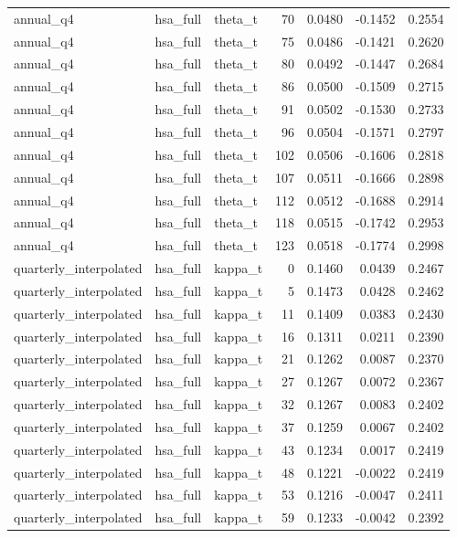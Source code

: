 \begin{tabular}{lllrrrr}
annual\_q4 & hsa\_full & theta\_t & 70 & 0.0480 & -0.1452 & 0.2554 \\
annual\_q4 & hsa\_full & theta\_t & 75 & 0.0486 & -0.1421 & 0.2620 \\
annual\_q4 & hsa\_full & theta\_t & 80 & 0.0492 & -0.1447 & 0.2684 \\
annual\_q4 & hsa\_full & theta\_t & 86 & 0.0500 & -0.1509 & 0.2715 \\
annual\_q4 & hsa\_full & theta\_t & 91 & 0.0502 & -0.1530 & 0.2733 \\
annual\_q4 & hsa\_full & theta\_t & 96 & 0.0504 & -0.1571 & 0.2797 \\
annual\_q4 & hsa\_full & theta\_t & 102 & 0.0506 & -0.1606 & 0.2818 \\
annual\_q4 & hsa\_full & theta\_t & 107 & 0.0511 & -0.1666 & 0.2898 \\
annual\_q4 & hsa\_full & theta\_t & 112 & 0.0512 & -0.1688 & 0.2914 \\
annual\_q4 & hsa\_full & theta\_t & 118 & 0.0515 & -0.1742 & 0.2953 \\
annual\_q4 & hsa\_full & theta\_t & 123 & 0.0518 & -0.1774 & 0.2998 \\
quarterly\_interpolated & hsa\_full & kappa\_t & 0 & 0.1460 & 0.0439 & 0.2467 \\
quarterly\_interpolated & hsa\_full & kappa\_t & 5 & 0.1473 & 0.0428 & 0.2462 \\
quarterly\_interpolated & hsa\_full & kappa\_t & 11 & 0.1409 & 0.0383 & 0.2430 \\
quarterly\_interpolated & hsa\_full & kappa\_t & 16 & 0.1311 & 0.0211 & 0.2390 \\
quarterly\_interpolated & hsa\_full & kappa\_t & 21 & 0.1262 & 0.0087 & 0.2370 \\
quarterly\_interpolated & hsa\_full & kappa\_t & 27 & 0.1267 & 0.0072 & 0.2367 \\
quarterly\_interpolated & hsa\_full & kappa\_t & 32 & 0.1267 & 0.0083 & 0.2402 \\
quarterly\_interpolated & hsa\_full & kappa\_t & 37 & 0.1259 & 0.0067 & 0.2402 \\
quarterly\_interpolated & hsa\_full & kappa\_t & 43 & 0.1234 & 0.0017 & 0.2419 \\
quarterly\_interpolated & hsa\_full & kappa\_t & 48 & 0.1221 & -0.0022 & 0.2419 \\
quarterly\_interpolated & hsa\_full & kappa\_t & 53 & 0.1216 & -0.0047 & 0.2411 \\
quarterly\_interpolated & hsa\_full & kappa\_t & 59 & 0.1233 & -0.0042 & 0.2392 \\

\end{tabular}
